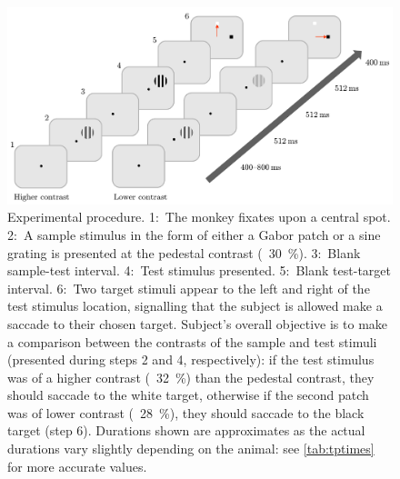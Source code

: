 \begin{figure}[htbp]
\begin{center}
\includegraphics[width=\linewidth]{figs/task/PLtask1.pdf}
\end{center}
\caption{
Experimental procedure.
1:~The monkey fixates upon a central spot.
2:~A sample stimulus in the form of either a Gabor patch or a sine grating is presented at the pedestal contrast (\eg{}~\SI{30}{\percent}).
3:~Blank sample-test interval.
4:~Test stimulus presented.
5:~Blank test-target interval.
6:~Two target stimuli appear to the left and right of the test stimulus location, signalling that the subject is allowed make a saccade to their chosen target.
Subject's overall objective is to make a comparison between the contrasts of the sample and test stimuli (presented during steps 2 and 4, respectively): if the test stimulus was of a higher contrast (\eg{}~\SI{32}{\percent}) than the pedestal contrast, they should saccade to the white target, otherwise if the second patch was of lower contrast (\eg{}~\SI{28}{\percent}), they should saccade to the black target (step 6).
Durations shown are approximates as the actual durations vary slightly depending on the animal: see \autoref{tab:tptimes} for more accurate values.}
\label{fig:pltask1}
\end{figure}

